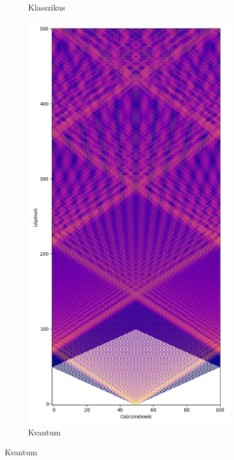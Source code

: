 \begin{figure}[H]
\begin{subfigure}{.45\linewidth}
    \caption{Klasszikus}
  \end{subfigure}
  \begin{subfigure}{.45\linewidth}
    \centering
    \includegraphics[width=\linewidth]{./figures/quantum/quantum_simulation_long.jpg}
    \caption{Kvantum}
  \end{subfigure}
\end{figure}